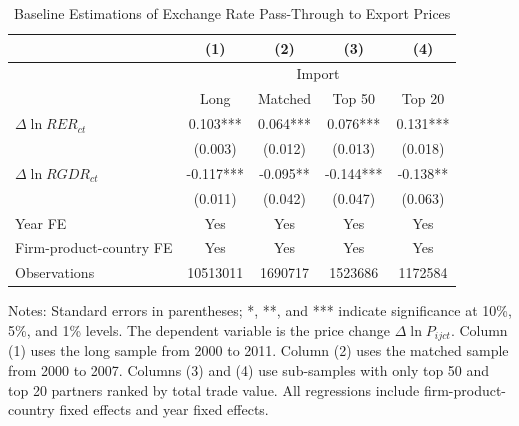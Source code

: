 \documentclass[12pt]{article}
\begin{document}
\begin{table}[htbp]
	\centering
	\caption{Baseline Estimations of Exchange Rate Pass-Through to Export Prices}
	\begin{threeparttable}
		\begin{tabular}{lcccc}
			\toprule
			& (1)   & (2)   & (3)   & (4) \\
			\midrule
			& \multicolumn{4}{c}{Import} \\
			& Long & Matched & Top 50 & Top 20 \\
			\midrule
			$\Delta \ln RER_{ct}$ & 0.103*** & 0.064*** & 0.076*** & 0.131*** \\
			& (0.003) & (0.012) & (0.013) & (0.018) \\
			$\Delta \ln RGDR_{ct}$ &  -0.117*** & -0.095** & -0.144*** & -0.138** \\
			& (0.011) & (0.042) & (0.047) & (0.063) \\
			Year FE  & Yes   & Yes   & Yes   & Yes \\
			Firm-product-country FE & Yes   & Yes   & Yes   & Yes \\
			Observations & 10513011 & 1690717 & 1523686 & 1172584 \\
			\bottomrule
		\end{tabular}
		\begin{tablenotes}
			\footnotesize
			\item[Notes:] Standard errors in parentheses; *, **, and *** indicate significance at 10\%, 5\%, and 1\% levels. The dependent variable is the price change $\Delta \ln P_{ijct}$. Column (1) uses the long sample from 2000 to 2011. Column (2) uses the matched sample from 2000 to 2007. Columns (3) and (4) use sub-samples with only top 50 and top 20 partners ranked by total trade value. All regressions include firm-product-country fixed effects and year fixed effects. 
		\end{tablenotes}
	\end{threeparttable}
	\label{tab.baseline.exp}
\end{table}
\end{document}
